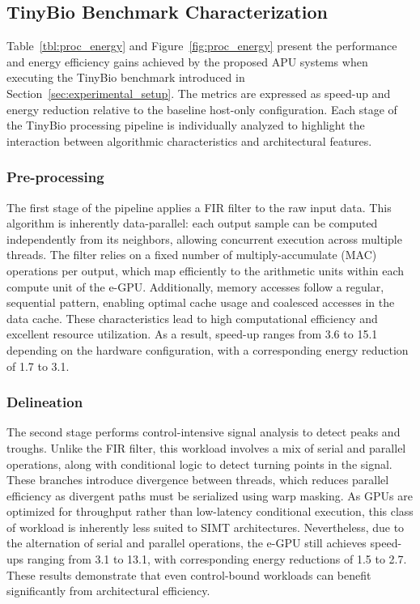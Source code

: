         \subsection{TinyBio Benchmark Characterization}
        
            Table~\ref{tbl:proc_energy} and Figure~\ref{fig:proc_energy} present the performance and energy efficiency gains achieved by the proposed APU systems when executing the TinyBio benchmark introduced in Section~\ref{sec:experimental_setup}. The metrics are expressed as speed-up and energy reduction relative to the baseline host-only configuration. Each stage of the TinyBio processing pipeline is individually analyzed to highlight the interaction between algorithmic characteristics and architectural features.

            \vspace{-1em}
            \subsubsection*{Pre-processing} 
            
                The first stage of the pipeline applies a FIR filter to the raw input data. This algorithm is inherently data-parallel: each output sample can be computed independently from its neighbors, allowing concurrent execution across multiple threads. The filter relies on a fixed number of multiply-accumulate (MAC) operations per output, which map efficiently to the arithmetic units within each compute unit of the \mbox{e-GPU}. Additionally, memory accesses follow a regular, sequential pattern, enabling optimal cache usage and coalesced accesses in the data cache. These characteristics lead to high computational efficiency and excellent resource utilization. As a result, speed-up ranges from \SI{3.6}{\times} to \SI{15.1}{\times} depending on the hardware configuration, with a corresponding energy reduction of \SI{1.7}{\times} to \SI{3.1}{\times}.

            \vspace{-1em}
            \subsubsection*{Delineation} 
            
                The second stage performs control-intensive signal analysis to detect peaks and troughs. Unlike the FIR filter, this workload involves a mix of serial and parallel operations, along with conditional logic to detect turning points in the signal. These branches introduce divergence between threads, which reduces parallel efficiency as divergent paths must be serialized using warp masking. As GPUs are optimized for throughput rather than low-latency conditional execution, this class of workload is inherently less suited to SIMT architectures. Nevertheless, due to the alternation of serial and parallel operations, the \mbox{e-GPU} still achieves speed-ups ranging from \SI{3.1}{\times} to \SI{13.1}{\times}, with corresponding energy reductions of \SI{1.5}{\times} to \SI{2.7}{\times}. These results demonstrate that even control-bound workloads can benefit significantly from architectural efficiency.

